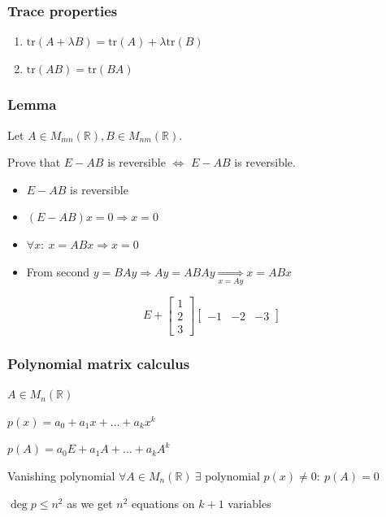 \documentclass[fullscreen=true, bookmarks=true, hyperref={pdfencoding=unicode}]{beamer}
\begin{document}
\begin{frame}
  \frametitle{Trace properties}
  \begin{enumerate}
    \item $\mathrm{tr}(A + \lambda B) = \mathrm{tr}(A) + \lambda \mathrm{tr}(B)$
    \item $\mathrm{tr}(AB) = \mathrm{tr}(BA)$
  \end{enumerate}
\end{frame}


\begin{frame}
 \frametitle{Lemma}
    Let $A \in M_{mn}(\mathbb{R}), B \in M_{nm}(\mathbb{R})$.
    
    Prove that $E - AB$ is reversible $\Leftrightarrow$ $E - AB$ is reversible.

  \pause
  \begin{itemize}
    \item $E - AB$ is reversible \pause
    \item $(E - AB)x=0 \Rightarrow x=0$ \pause
    \item $\forall x:\ x = ABx \Rightarrow x=0$ \pause
    \item From second $y=BAy \Rightarrow Ay=ABAy \underset{x=Ay}{\Rightarrow} x = ABx$
  \end{itemize}

  \begin{example}
    $$E + \begin{bmatrix}
      1 \\ 2 \\ 3
    \end{bmatrix}
    \begin{bmatrix}
      -1 & -2 & -3
    \end{bmatrix}$$
  \end{example}
\end{frame}

\begin{frame}
  \frametitle{Polynomial matrix calculus}
  $A \in M_{n}(\mathbb{R})$

  $p(x) = a_0 + a_1x + \dots + a_k x^k$

  $p(A) = a_0E + a_1A + \dots + a_k A^k$

  \vspace{1cm}\pause
  \begin{block}{Vanishing polynomial}
    $\forall A \in M_{n}(\mathbb{R})\ \exists$ polynomial $p(x) \neq 0:\ p(A) = 0$
  \end{block}

  $\deg p \leq n^2$ as we get $n^2$ equations on $k+1$ variables
\end{frame}
\end{document}

